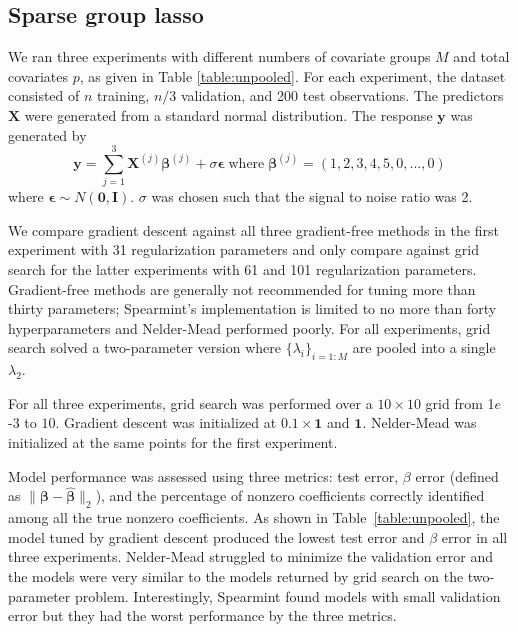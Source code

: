 \documentclass[12pt]{article}
\begin{document}
\subsection{Sparse group lasso}\label{sec:simulation_sgl}
We ran three experiments with different numbers of covariate groups $M$ and total covariates $p$, as given in Table \ref{table:unpooled}. For each experiment, the dataset consisted of $n$ training, $n/3$ validation, and 200 test observations. The predictors $\boldsymbol X$ were generated from a standard normal distribution. The response $\boldsymbol y$ was generated by
\begin{equation}
\boldsymbol y = \sum\limits_{j=1}^3 \boldsymbol X^{(j)} \boldsymbol \beta^{(j)} + \sigma \boldsymbol \epsilon \; \text{where} \; \boldsymbol \beta^{(j)} = (1, 2, 3, 4, 5, 0, ..., 0)
\end{equation}
where $\boldsymbol \epsilon \sim N(\boldsymbol 0, \boldsymbol I)$. $\sigma$ was chosen such that the signal to noise ratio was 2. 

We compare gradient descent against all three gradient-free methods in the first experiment with 31 regularization parameters and only compare against grid search for the latter experiments with 61 and 101 regularization parameters. Gradient-free methods are generally not recommended for tuning more than thirty parameters; Spearmint's implementation is limited to no more than forty hyperparameters and Nelder-Mead performed poorly. For all experiments, grid search solved a two-parameter version where $\{\lambda_i\}_{i=1:M}$ are pooled into a single $\lambda_2$.

For all three experiments, grid search was performed over a $10 \times 10$ grid from 1$e$-3 to $10$. Gradient descent was initialized at $0.1 \times \boldsymbol 1$ and $\boldsymbol 1$. Nelder-Mead was initialized at the same points for the first experiment.

Model performance was assessed using three metrics: test error, $\beta$ error (defined as $\| \boldsymbol \beta - \hat {\boldsymbol \beta} \|_2$), and the percentage of nonzero coefficients correctly identified among all the true nonzero coefficients. As shown in Table~\ref{table:unpooled}, the model tuned by gradient descent produced the lowest test error and $\beta$ error in all three experiments. Nelder-Mead struggled to minimize the validation error and the models were very similar to the models returned by grid search on the two-parameter problem. Interestingly, Spearmint found models with small validation error but they had the worst performance by the three metrics.
\end{document}
